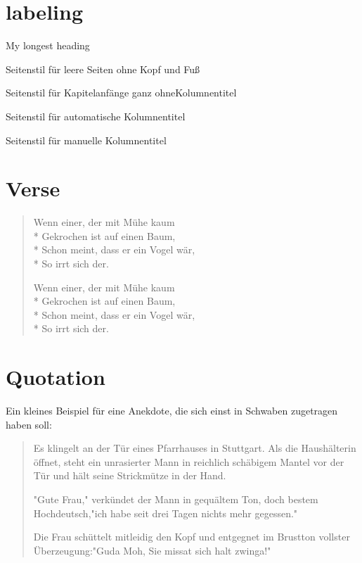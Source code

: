 \section{labeling}
\begin{labeling}[ ]{My longest heading}
	\item[empty]Seitenstil für leere Seiten ohne Kopf und Fuß
	\item[plain]Seitenstil für Kapitelanfänge ganz ohneKolumnentitel
	\item[headings]Seitenstil für automatische Kolumnentitel
	\item[my longest heading]Seitenstil für manuelle Kolumnentitel
\end{labeling}


\section{Verse}
\begin{verse}
	Wenn einer, der mit Mühe kaum\\*
	Gekrochen ist auf einen Baum,\\*
	Schon meint, dass er ein Vogel wär,\\*
	So irrt sich der.
    \par
	Wenn einer, der mit Mühe kaum\\*
	Gekrochen ist auf einen Baum,\\*
	Schon meint, dass er ein Vogel wär,\\*
	So irrt sich der.
	
\end{verse}

\section{Quotation}
	Ein kleines Beispiel für eine Anekdote, die sich einst in Schwaben zugetragen haben soll:
	\begin{quotation}
		Es klingelt an der Tür eines Pfarrhauses in Stuttgart. Als die Haushälterin öffnet, steht ein unrasierter Mann in reichlich schäbigem Mantel vor der Tür und hält seine Strickmütze in der Hand.
		
		"Gute Frau," verkündet der Mann in gequältem Ton, doch bestem Hochdeutsch,"ich habe seit drei Tagen nichts mehr gegessen."
		
		Die Frau schüttelt mitleidig den Kopf und entgegnet im Brustton vollster Überzeugung:"Guda Moh, Sie missat sich halt zwinga!"
	\end{quotation}

